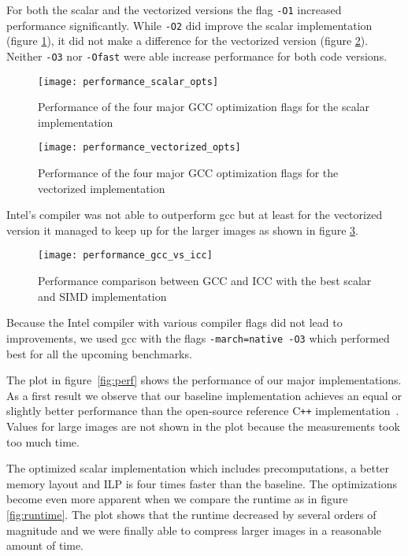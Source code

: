 For both the scalar and the vectorized versions the flag \texttt{-O1} increased
performance significantly. While \texttt{-O2} did improve the scalar
implementation (figure \ref{fig:perf_scal}), it did not make a difference for
the vectorized version (figure \ref{fig:perf_vec}). Neither \texttt{-O3} nor
\texttt{-Ofast} were able increase performance for both code versions.

\begin{figure}[H]
  \centering
  \texttt{[image: performance\_scalar\_opts]}
  \caption{Performance of the four major GCC optimization flags for the scalar
    implementation}\label{fig:perf_scal}
\end{figure}

\begin{figure}[H]
  \centering
  \texttt{[image: performance\_vectorized\_opts]}
  \caption{Performance of the four major GCC optimization flags for the vectorized implementation}\label{fig:perf_vec}
\end{figure}

Intel's compiler was not able to outperform gcc but at least for the vectorized
version it managed to keep up for the larger images as shown in figure
\ref{fig:perf_gcc_vs_icc}.

\begin{figure}[H]
  \centering
  \texttt{[image: performance\_gcc\_vs\_icc]}
  \caption{Performance comparison between GCC and ICC with the best scalar and
    SIMD implementation}\label{fig:perf_gcc_vs_icc}
\end{figure}

Because the Intel compiler with various compiler flags did not lead to
improvements, we used gcc with the flags \texttt{-march=native -O3} which
performed best for all the upcoming benchmarks.

 The plot in figure~\ref{fig:perf} shows the performance of
our major implementations. As a first result we observe that our baseline
implementation achieves an equal or slightly better performance than the
open-source reference C\texttt{++} implementation~\cite{github-cpp}. Values for
large images are not shown in the plot because the measurements took too much
time.

The optimized scalar implementation which includes precomputations, a better
memory layout and ILP is four times faster than the baseline. The optimizations
become even more apparent when we compare the runtime as in figure
\ref{fig:runtime}. The plot shows that the runtime decreased by several orders
of magnitude and we were finally able to compress larger images in a reasonable
amount of time.

